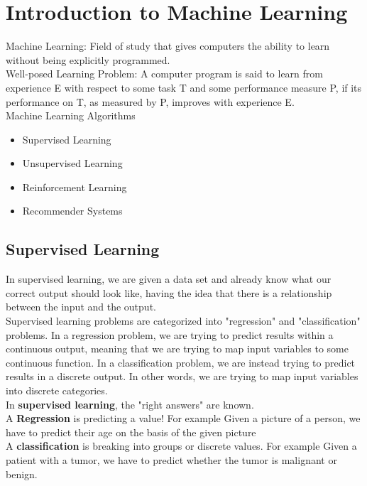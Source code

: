 \section{Introduction to Machine Learning}


Machine Learning: Field of study that gives computers the ability to learn without being explicitly programmed. \\

Well-posed Learning Problem: A computer program is said to learn from experience E with respect to some task T and some performance measure P, if its performance on T, as measured by P, improves with experience E. \\

Machine Learning Algorithms
\begin{itemize}
\item Supervised Learning
\item Unsupervised Learning
\item Reinforcement Learning
\item Recommender Systems
\end{itemize}


\subsection{Supervised Learning}

In supervised learning, we are given a data set and already know what our correct output should look like, having the idea that there is a relationship between the input and the output.\\

Supervised learning problems are categorized into "regression" and "classification" problems. In a regression problem, we are trying to predict results within a continuous output, meaning that we are trying to map input variables to some continuous function. In a classification problem, we are instead trying to predict results in a discrete output. In other words, we are trying to map input variables into discrete categories. \\

In \textbf{supervised learning}, the "right answers" are known.\\

A \textbf{Regression} is predicting a value! For example Given a picture of a person, we have to predict their age on the basis of the given picture\\

A \textbf{classification} is breaking into groups or discrete values.  For example Given a patient with a tumor, we have to predict whether the tumor is malignant or benign.\\


